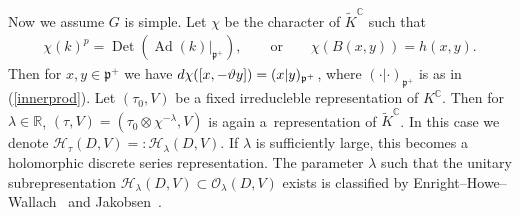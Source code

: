 \documentclass[11pt]{article}
\numberwithin{equation}{section}
\newcommand{\BR}{\mathbb{R}}
\newcommand{\BC}{\mathbb{C}}
\newcommand{\fp}{\mathfrak{p}}
\newcommand{\cH}{\mathcal{H}}
\newcommand{\cO}{\mathcal{O}}
\newcommand{\Det}{\operatorname{Det}}
\begin{document}
Now we assume $G$ is simple. Let $\chi$ be the character of $\tilde{K}^\BC$ such that
\begin{gather}\label{char}
\chi(k)^p=\Det(\operatorname{Ad}(k)|_{\fp^+}),\qquad \text{or} \qquad \chi(B(x,y))=h(x,y).
\end{gather}
Then for $x,y\in\fp^+$ we have ${\rm d}\chi([x,-\vartheta y])=(x|y)_{\fp^+}$, where $(\cdot|\cdot)_{\fp^+}$ is as in (\ref{innerprod}).
Let $(\tau_0,V)$ be a fixed irreducleble representation of $K^\BC$.
Then for $\lambda\in\BR$, $(\tau,V)=(\tau_0\otimes\chi^{-\lambda},V)$ is again a~representation of $\tilde{K}^\BC$.
In this case we denote $\cH_\tau(D,V)=:\cH_\lambda(D,V)$.
If $\lambda$ is sufficiently large, this becomes a holomorphic discrete series representation.
The parameter $\lambda$ such that the unitary subrepresentation $\cH_\lambda(D,V)\subset\cO_\lambda(D,V)$ exists is classified by
Enright--Howe--Wallach~\cite{EHW} and Jakobsen~\cite{J}.
\end{document}
